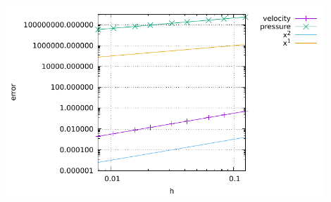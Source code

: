 \begin{center}
\includegraphics[width=12cm]{python_codes/fieldstone_34/results/errors.pdf}
\end{center}



